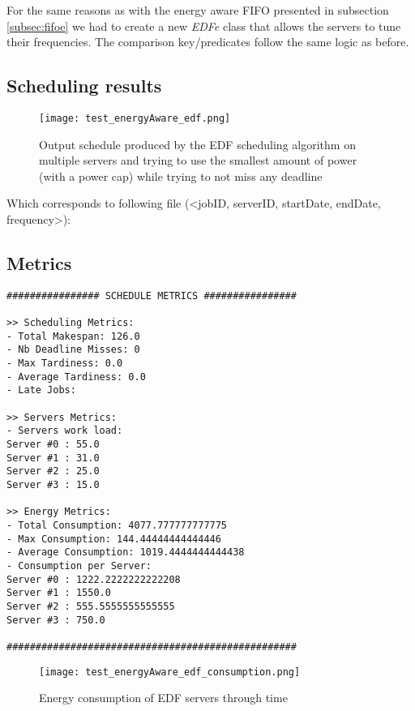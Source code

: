 \documentclass[./report.tex]{subfiles}
\begin{document}
For the same reasons as with the energy aware FIFO presented in subsection \ref{subsec:fifoe} we had to create a new \textit{EDFe} class that allows the servers to tune their frequencies. The comparison key/predicates follow the same logic as before.

\newpage
\subsection{Scheduling results}
\begin{figure}[!h]
	\center
	\texttt{[image: test\_energyAware\_edf.png]}
	\caption{Output schedule produced by the EDF scheduling algorithm on multiple servers and trying to use the smallest amount of power (with a power cap) while trying to not miss any deadline}
	\label{fig:energyAware_edf} 
\end{figure}

Which corresponds to following file (<jobID, serverID, startDate, endDate, frequency>):


\newpage
\subsection{Metrics}
\begin{lstlisting}[style=txt, caption={Metrics for EDF on multiple energy aware servers}]
################ SCHEDULE METRICS ################

>> Scheduling Metrics: 
- Total Makespan: 126.0
- Nb Deadline Misses: 0
- Max Tardiness: 0.0
- Average Tardiness: 0.0
- Late Jobs: 

>> Servers Metrics: 
- Servers work load:
Server #0 : 55.0
Server #1 : 31.0
Server #2 : 25.0
Server #3 : 15.0

>> Energy Metrics: 
- Total Consumption: 4077.777777777775
- Max Consumption: 144.44444444444446
- Average Consumption: 1019.4444444444438
- Consumption per Server: 
Server #0 : 1222.2222222222208
Server #1 : 1550.0
Server #2 : 555.5555555555555
Server #3 : 750.0

##################################################
\end{lstlisting}

\begin{figure}[!h]
	\center
	\hspace*{-5em} \texttt{[image: test\_energyAware\_edf\_consumption.png]}
	\caption{Energy consumption of EDF servers through time}
	\label{fig:edf_consumption} 
\end{figure}
\end{document}
